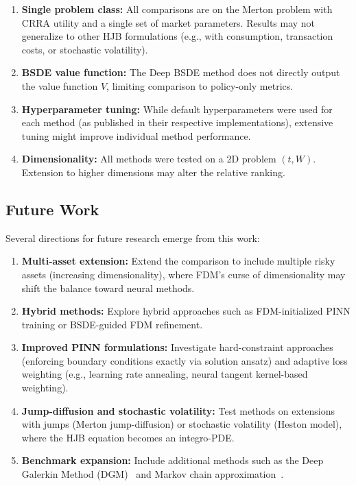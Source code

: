 \documentclass[12pt,a4paper]{article}
\begin{document}
\begin{enumerate}
    \item \textbf{Single problem class:} All comparisons are on the Merton problem with CRRA utility and a single set of market parameters. Results may not generalize to other HJB formulations (e.g., with consumption, transaction costs, or stochastic volatility).
    
    \item \textbf{BSDE value function:} The Deep BSDE method does not directly output the value function $V$, limiting comparison to policy-only metrics.
    
    \item \textbf{Hyperparameter tuning:} While default hyperparameters were used for each method (as published in their respective implementations), extensive tuning might improve individual method performance.
    
    \item \textbf{Dimensionality:} All methods were tested on a 2D problem $(t, W)$. Extension to higher dimensions may alter the relative ranking.
\end{enumerate}

\subsection{Future Work}

Several directions for future research emerge from this work:

\begin{enumerate}
    \item \textbf{Multi-asset extension:} Extend the comparison to include multiple risky assets (increasing dimensionality), where FDM's curse of dimensionality may shift the balance toward neural methods.
    
    \item \textbf{Hybrid methods:} Explore hybrid approaches such as FDM-initialized PINN training or BSDE-guided FDM refinement.
    
    \item \textbf{Improved PINN formulations:} Investigate hard-constraint approaches (enforcing boundary conditions exactly via solution ansatz) and adaptive loss weighting (e.g., learning rate annealing, neural tangent kernel-based weighting).
    
    \item \textbf{Jump-diffusion and stochastic volatility:} Test methods on extensions with jumps (Merton jump-diffusion) or stochastic volatility (Heston model), where the HJB equation becomes an integro-PDE.
    
    \item \textbf{Benchmark expansion:} Include additional methods such as the Deep Galerkin Method (DGM)~\cite{sirignano2018} and Markov chain approximation~\cite{kushner2001}.
\end{enumerate}
\end{document}
